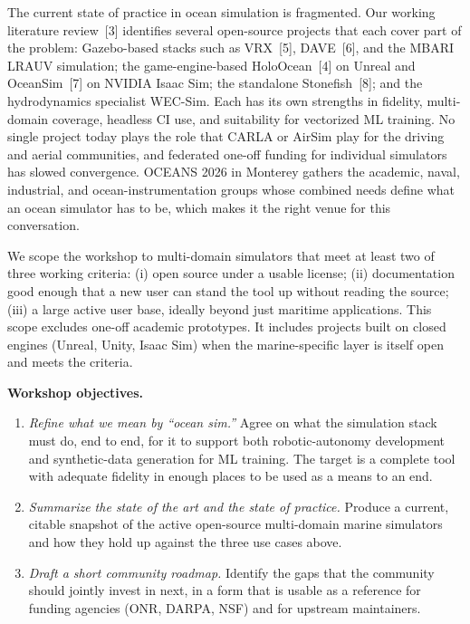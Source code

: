 \documentclass[10pt]{article}
\begin{document}
The current state of practice in ocean simulation is fragmented. Our working literature review~[3] identifies several open-source projects that each cover part of the problem: Gazebo-based stacks such as VRX~[5], DAVE~[6], and the MBARI LRAUV simulation; the game-engine-based HoloOcean~[4] on Unreal and OceanSim~[7] on NVIDIA Isaac Sim; the standalone Stonefish~[8]; and the hydrodynamics specialist WEC-Sim. Each has its own strengths in fidelity, multi-domain coverage, headless CI use, and suitability for vectorized ML training. No single project today plays the role that CARLA or AirSim play for the driving and aerial communities, and federated one-off funding for individual simulators has slowed convergence. OCEANS 2026 in Monterey gathers the academic, naval, industrial, and ocean-instrumentation groups whose combined needs define what an ocean simulator has to be, which makes it the right venue for this conversation.

We scope the workshop to multi-domain simulators that meet at least two of three working criteria: (i) open source under a usable license; (ii) documentation good enough that a new user can stand the tool up without reading the source; (iii) a large active user base, ideally beyond just maritime applications. This scope excludes one-off academic prototypes. It includes projects built on closed engines (Unreal, Unity, Isaac Sim) when the marine-specific layer is itself open and meets the criteria.

\textbf{Workshop objectives.}
\begin{enumerate}[label=(O\arabic*)]
  \item \emph{Refine what we mean by ``ocean sim.''} Agree on what the simulation stack must do, end to end, for it to support both robotic-autonomy development and synthetic-data generation for ML training. The target is a complete tool with adequate fidelity in enough places to be used as a means to an end.
  \item \emph{Summarize the state of the art and the state of practice.} Produce a current, citable snapshot of the active open-source multi-domain marine simulators and how they hold up against the three use cases above.
  \item \emph{Draft a short community roadmap.} Identify the gaps that the community should jointly invest in next, in a form that is usable as a reference for funding agencies (ONR, DARPA, NSF) and for upstream maintainers.
\end{enumerate}
\end{document}
